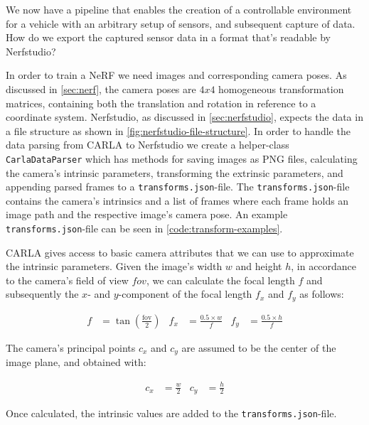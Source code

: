 We now have a pipeline that enables the creation of a controllable environment for a vehicle with an arbitrary setup of sensors, and subsequent capture of data. How do we export the captured sensor data in a format that's readable by Nerfstudio?

In order to train a NeRF we need images and corresponding camera poses. As discussed in \autoref{sec:nerf}, the camera poses are $4x4$ homogeneous transformation matrices, containing both the translation and rotation in reference to a coordinate system. Nerfstudio, as discussed in \autoref{sec:nerfstudio}, expects the data in a file structure as shown in \autoref{fig:nerfstudio-file-structure}. In order to handle the data parsing from CARLA to Nerfstudio we create a helper-class \texttt{CarlaDataParser} which has methods for saving images as PNG files, calculating the camera's intrinsic parameters, transforming the extrinsic parameters, and appending parsed frames to a \texttt{transforms.json}-file. The \texttt{transforms.json}-file contains the camera's intrinsics and a list of frames where each frame holds an image path and the respective image's camera pose. An example \texttt{transforms.json}-file can be seen in \autoref{code:transform-examples}.




CARLA gives access to basic camera attributes that we can use to approximate the intrinsic parameters. Given the image's width $w$ and height $h$, in accordance to the camera's field of view $fov$, we can calculate the focal length $f$ and subsequently the $x$- and $y$-component of the focal length $f_x$ and $f_y$ as follows:

\begin{align*}
f &= \tan\left(\frac{\text{fov}}{2}\right) &
f_x &= \frac{0.5 \times w}{f} &
f_y &= \frac{0.5 \times h}{f}
\end{align*}

The camera's principal points $c_x$ and $c_y$ are assumed to be the center of the image plane, and obtained with:

\begin{align*}
c_x &= \frac{w}{2} &
c_y &= \frac{h}{2}
\end{align*}

Once calculated, the intrinsic values are added to the \texttt{transforms.json}-file.


